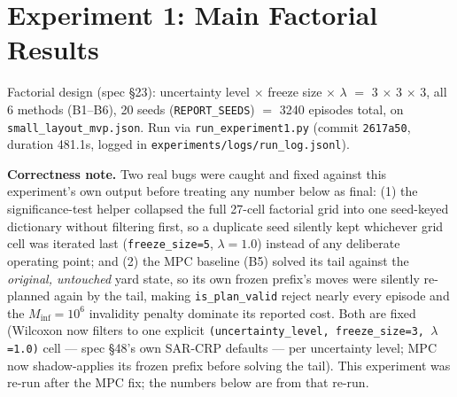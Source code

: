 \documentclass[11pt]{article}
\begin{document}
\section{Experiment 1: Main Factorial Results}

Factorial design (spec \S23): uncertainty level $\times$ freeze size
$\times$ $\lambda$ $=$ 3 $\times$ 3 $\times$ 3, all 6 methods (B1--B6),
20 seeds (\texttt{REPORT\_SEEDS}) $=$ 3240 episodes total, on
\texttt{small\_layout\_mvp.json}. Run via \texttt{run\_experiment1.py}
(commit \texttt{2617a50}, duration 481.1s, logged in
\texttt{experiments/logs/run\_log.jsonl}).

\textbf{Correctness note.} Two real bugs were caught and fixed against
this experiment's own output before treating any number below as final:
(1) the significance-test helper collapsed the full 27-cell factorial grid
into one seed-keyed dictionary without filtering first, so a duplicate
seed silently kept whichever grid cell was iterated last
(\texttt{freeze\_size=5}, $\lambda=1.0$) instead of any deliberate
operating point; and (2) the MPC baseline (B5) solved its tail against the
\emph{original, untouched} yard state, so its own frozen prefix's moves
were silently re-planned again by the tail, making \texttt{is\_plan\_valid}
reject nearly every episode and the $M_{\mathrm{inf}}=10^6$ invalidity
penalty dominate its reported cost. Both are fixed (Wilcoxon now filters
to one explicit \texttt{(uncertainty\_level, freeze\_size=3, $\lambda$=1.0)}
cell --- spec \S48's own SAR-CRP defaults --- per uncertainty level; MPC now
shadow-applies its frozen prefix before solving the tail). This experiment
was re-run after the MPC fix; the numbers below are from that re-run.
\end{document}
